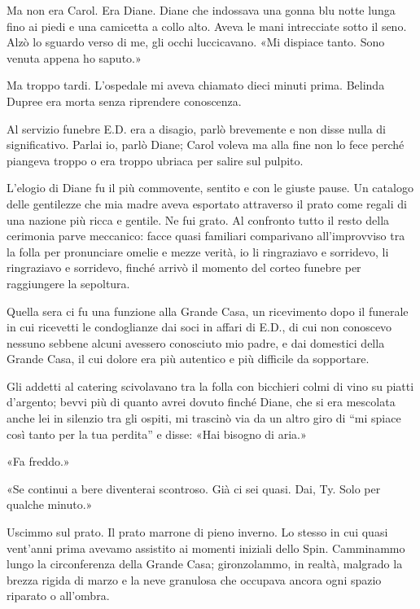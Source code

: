 Ma non era Carol. Era Diane. Diane che indossava una gonna blu notte
lunga fino ai piedi e una camicetta a collo alto. Aveva le mani
intrecciate sotto il seno. Alzò lo sguardo verso di me, gli occhi
luccicavano. «Mi dispiace tanto. Sono venuta appena ho saputo.»

Ma troppo tardi. L'ospedale mi aveva chiamato dieci minuti prima.
Belinda Dupree era morta senza riprendere conoscenza.

\separatorefiori

Al servizio funebre E.D. era a disagio, parlò brevemente e non disse
nulla di significativo. Parlai io, parlò Diane; Carol voleva ma alla
fine non lo fece perché piangeva troppo o era troppo ubriaca per salire
sul pulpito.

L'elogio di Diane fu il più commovente, sentito e con le giuste pause.
Un catalogo delle gentilezze che mia madre aveva esportato attraverso il
prato come regali di una nazione più ricca e gentile. Ne fui grato. Al
confronto tutto il resto della cerimonia parve meccanico: facce quasi
familiari comparivano all'improvviso tra la folla per pronunciare omelie
e mezze verità, io li ringraziavo e sorridevo, li ringraziavo e
sorridevo, finché arrivò il momento del corteo funebre per raggiungere
la sepoltura.

\separatorefiori

Quella sera ci fu una funzione alla Grande Casa, un ricevimento dopo il
funerale in cui ricevetti le condoglianze dai soci in affari di E.D., di
cui non conoscevo nessuno sebbene alcuni avessero conosciuto mio padre,
e dai domestici della Grande Casa, il cui dolore era più autentico e più
difficile da sopportare.

Gli addetti al catering scivolavano tra la folla con bicchieri colmi di
vino su piatti d'argento; bevvi più di quanto avrei dovuto finché Diane,
che si era mescolata anche lei in silenzio tra gli ospiti, mi trascinò
via da un altro giro di ``mi spiace così tanto per la tua perdita'' e
disse: «Hai bisogno di aria.»

«Fa freddo.»

«Se continui a bere diventerai scontroso. Già ci sei quasi. Dai, Ty.
Solo per qualche minuto.»

Uscimmo sul prato. Il prato marrone di pieno inverno. Lo stesso in cui
quasi vent'anni prima avevamo assistito ai momenti iniziali dello Spin.
Camminammo lungo la circonferenza della Grande Casa; gironzolammo, in
realtà, malgrado la brezza rigida di marzo e la neve granulosa che
occupava ancora ogni spazio riparato o all'ombra.

